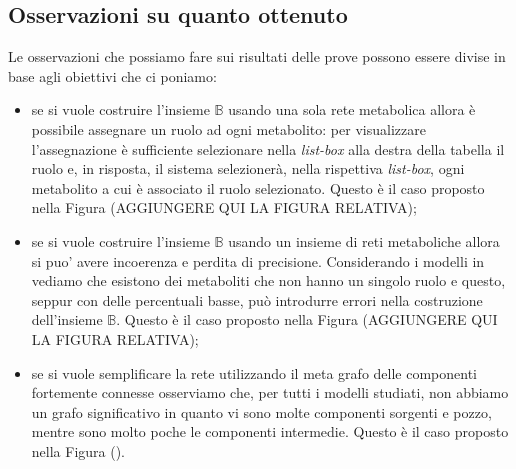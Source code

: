 \subsection{Osservazioni su quanto ottenuto}
Le osservazioni che possiamo fare sui risultati delle prove possono
essere divise in base agli obiettivi che ci poniamo:
\begin{itemize}
\item se si vuole costruire l'insieme $\mathbb{B}$ usando una sola
  rete metabolica allora \`e possibile assegnare un ruolo ad ogni
  metabolito: per visualizzare l'assegnazione \`e sufficiente
  selezionare nella \emph{list-box} alla destra della tabella il ruolo
  e, in risposta, il sistema selezioner\`a, nella rispettiva
  \emph{list-box}, ogni metabolito a cui \`e associato il ruolo
  selezionato. Questo \`e il caso proposto nella Figura (AGGIUNGERE
  QUI LA FIGURA RELATIVA);
\item se si vuole costruire l'insieme $\mathbb{B}$ usando un insieme
  di reti metaboliche allora si puo' avere incoerenza e perdita di
  precisione. Considerando i modelli in \cite{MetExplore} vediamo che
  esistono dei metaboliti che non hanno un singolo ruolo e questo,
  seppur con delle percentuali basse, pu\`o introdurre errori nella
  costruzione dell'insieme $\mathbb{B}$. Questo \`e il caso proposto
  nella Figura (AGGIUNGERE QUI LA FIGURA RELATIVA);
\item se si vuole semplificare la rete utilizzando il meta grafo delle
  componenti fortemente connesse osserviamo che, per tutti i modelli
  studiati, non abbiamo un grafo significativo in quanto vi sono molte
  componenti sorgenti e pozzo, mentre sono molto poche le componenti
  intermedie. Questo \`e il caso proposto nella Figura ().
\end{itemize}
